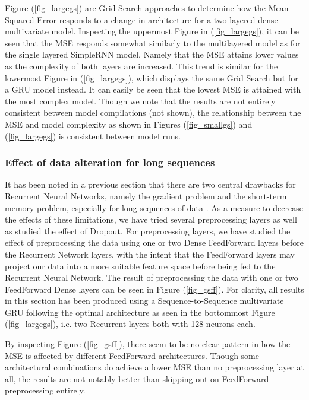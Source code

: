 \documentclass
[twocolumn,
secnumarabic,
nobibnotes,
aps,
prl,
reprint,
groupedaddress,
amsmath,
amssymb,
]{revtex4-2}
\begin{document}
Figure (\ref{fig_largegs}) are Grid Search approaches to determine how the Mean Squared Error responds to a change in architecture for a two layered dense multivariate model. Inspecting the uppermost Figure in (\ref{fig_largegs}), it can be seen that the MSE responds somewhat similarly to the multilayered model as for the single layered SimpleRNN model. Namely that the MSE attains lower values as the complexity of both layers are increased. This trend is similar for the lowermost Figure in (\ref{fig_largegs}), which displays the same Grid Search but for a GRU model instead. It can easily be seen that the lowest MSE is attained with the most complex model. Though we note that the results are not entirely consistent between model compilations (not shown), the relationship between the MSE and model complexity as shown in Figures (\ref{fig_smallgs}) and (\ref{fig_largegs}) is consistent between model runs. 

\subsubsection{Effect of data alteration for long sequences}
It has been noted in a previous section that there are two central drawbacks for Recurrent Neural Networks, namely the gradient problem and the short-term memory problem, especially for long sequences of data \cite{Geron2019}. As a measure to decrease the effects of these limitations, we have tried several preprocessing layers as well as studied the effect of Dropout. For preprocessing layers, we have studied the effect of preprocessing the data using one or two Dense FeedForward layers before the Recurrent Network layers, with the intent that the FeedForward layers may project our data into a more suitable feature space before being fed to the Recurrent Neural Network. The result of preprocessing the data with one or two FeedForward Dense layers can be seen in Figure (\ref{fig_gsff}). For clarity, all results in this section has been produced using a Sequence-to-Sequence multivariate GRU following the optimal architecture as seen in the bottommost Figure (\ref{fig_largegs}), i.e. two Recurrent layers both with 128 neurons each.

By inspecting Figure (\ref{fig_gsff}), there seem to be no clear pattern in how the MSE is affected by different FeedForward architectures. Though some architectural combinations do achieve a lower MSE than no preprocessing layer at all, the results are not notably better than skipping out on FeedForward preprocessing entirely.
\end{document}
